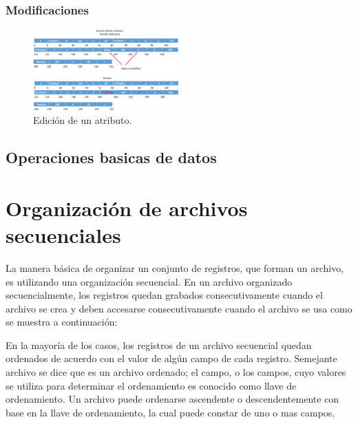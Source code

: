 \subsection{Modificaciones}
\begin{figure}[!ht]
\begin{center}
  \includegraphics[width=0.5\textwidth]{secciones/ejemploA/EdicionAtributo.png}
  \caption{Edición de un atributo.}
\end{center}
\end{figure}

\section{Operaciones basicas de datos}



\chapter[Organización de archivos secuenciales]{Organización de archivos secuenciales}
La manera básica de organizar un conjunto de registros, que forman un archivo, es utilizando una organización secuencial. En un archivo organizado secuencialmente, los  registros quedan grabados consecutivamente cuando el archivo se crea y deben accesarse consecutivamente cuando el archivo se usa como se muestra a continuación:


En la mayoría de los casos, los registros de un archivo secuencial quedan ordenados de acuerdo con el valor de algún campo de cada registro. Semejante archivo se dice que es un archivo ordenado; el campo, o los campos, cuyo valores se utiliza para determinar el ordenamiento es conocido como llave de ordenamiento. Un archivo puede ordenarse ascendente o descendentemente con base en la llave de ordenamiento, la cual puede constar de uno o mas campos.

